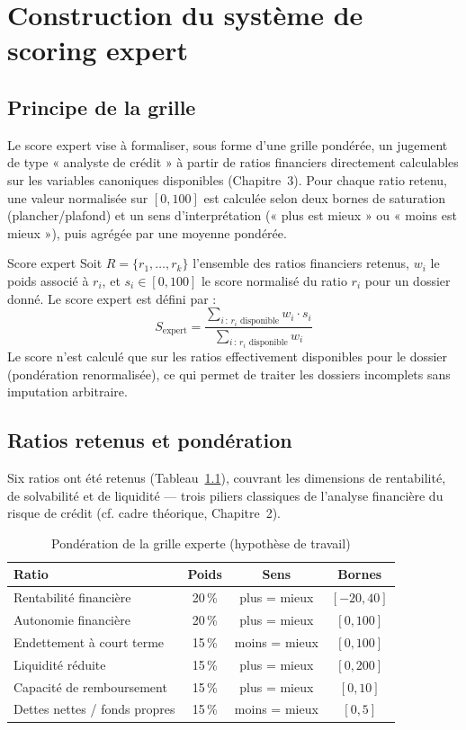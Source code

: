 \chapter{Construction du système de scoring expert}

\section{Principe de la grille}

Le score expert vise à formaliser, sous forme d'une grille pondérée, un jugement de type
« analyste de crédit » à partir de ratios financiers directement calculables sur les variables
canoniques disponibles (Chapitre~3). Pour chaque ratio retenu, une valeur normalisée sur
$[0, 100]$ est calculée selon deux bornes de saturation (plancher/plafond) et un sens
d'interprétation (« plus est mieux » ou « moins est mieux »), puis agrégée par une moyenne
pondérée.

\begin{definition}{Score expert}
Soit $R = \{r_1, \dots, r_k\}$ l'ensemble des ratios financiers retenus, $w_i$ le poids associé
à $r_i$, et $s_i \in [0, 100]$ le score normalisé du ratio $r_i$ pour un dossier donné. Le score
expert est défini par :
\[
S_{\text{expert}} = \frac{\sum_{i \,:\, r_i \text{ disponible}} w_i \cdot s_i}{\sum_{i \,:\, r_i \text{ disponible}} w_i}
\]
Le score n'est calculé que sur les ratios effectivement disponibles pour le dossier (pondération
renormalisée), ce qui permet de traiter les dossiers incomplets sans imputation arbitraire.
\end{definition}

\section{Ratios retenus et pondération}

Six ratios ont été retenus (Tableau~\ref{tab:grille-experte}), couvrant les dimensions de
rentabilité, de solvabilité et de liquidité — trois piliers classiques de l'analyse financière
du risque de crédit (cf. cadre théorique, Chapitre~2).

\begin{table}[h]
\centering
\small
\begin{tabular}{@{}lccc@{}}
\toprule
\textbf{Ratio} & \textbf{Poids} & \textbf{Sens} & \textbf{Bornes} \\
\midrule
Rentabilité financière & 20\,\% & plus = mieux & $[-20, 40]$ \\
Autonomie financière & 20\,\% & plus = mieux & $[0, 100]$ \\
Endettement à court terme & 15\,\% & moins = mieux & $[0, 100]$ \\
Liquidité réduite & 15\,\% & plus = mieux & $[0, 200]$ \\
Capacité de remboursement & 15\,\% & plus = mieux & $[0, 10]$ \\
Dettes nettes / fonds propres & 15\,\% & moins = mieux & $[0, 5]$ \\
\bottomrule
\end{tabular}
\caption{Pondération de la grille experte (hypothèse de travail)}
\label{tab:grille-experte}
\end{table}

